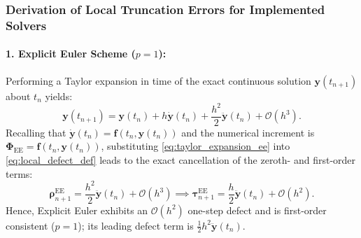 \documentclass[11pt,a4paper]{article}
\theoremstyle{definition}
\theoremstyle{remark}
\begin{document}
\subsubsection{Derivation of Local Truncation Errors for Implemented Solvers}
\paragraph{1. Explicit Euler Scheme ($p=1$):}
Performing a Taylor expansion in time of the exact continuous solution $\mathbf{y}(t_{n+1})$ about $t_n$ yields:
\begin{equation}
\label{eq:taylor_expansion_ee}
\mathbf{y}(t_{n+1}) = \mathbf{y}(t_n) + h \dot{\mathbf{y}}(t_n) + \frac{h^2}{2} \ddot{\mathbf{y}}(t_n) + \mathcal{O}(h^3).
\end{equation}
Recalling that $\dot{\mathbf{y}}(t_n) = \mathbf{f}(t_n, \mathbf{y}(t_n))$ and the numerical increment is $\mathbf{\Phi}_{\text{EE}} = \mathbf{f}(t_n, \mathbf{y}(t_n))$, substituting \eqref{eq:taylor_expansion_ee} into \eqref{eq:local_defect_def} leads to the exact cancellation of the zeroth- and first-order terms:
\begin{equation}
\label{eq:euler_defect_expansion}
\boldsymbol{\rho}_{n+1}^{\text{EE}} = \frac{h^2}{2} \ddot{\mathbf{y}}(t_n) + \mathcal{O}(h^3) \implies \boldsymbol{\tau}_{n+1}^{\text{EE}} = \frac{h}{2} \ddot{\mathbf{y}}(t_n) + \mathcal{O}(h^2).
\end{equation}
Hence, Explicit Euler exhibits an $\mathcal{O}(h^2)$ one-step defect and is first-order consistent ($p=1$); its leading defect term is $\tfrac12 h^2\ddot{\mathbf{y}}(t_n)$.
\end{document}

